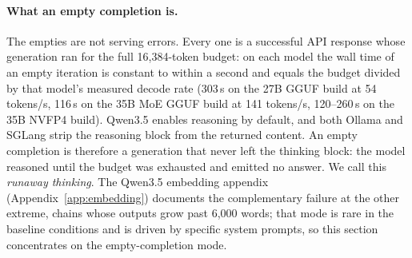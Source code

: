 \documentclass[11pt]{article}
\begin{document}
\paragraph{What an empty completion is.}
The empties are not serving errors. Every one is a successful API response
whose generation ran for the full 16{,}384-token budget: on each model the
wall time of an empty iteration is constant to within a second and equals the
budget divided by that model's measured decode rate (303\,s on the 27B GGUF
build at 54 tokens/s, 116\,s on the 35B MoE GGUF build at 141 tokens/s,
120--260\,s on the 35B NVFP4 build). Qwen3.5 enables reasoning by default,
and both Ollama and SGLang strip the reasoning block from the returned
content. An empty completion is therefore a generation that never left the
thinking block: the model reasoned until the budget was exhausted and emitted
no answer. We call this \emph{runaway thinking}. The Qwen3.5 embedding
appendix (Appendix~\ref{app:embedding}) documents the complementary
failure at the other extreme, chains whose outputs grow past 6{,}000 words;
that mode is rare in the baseline conditions and is driven by specific
system prompts, so this section concentrates on the empty-completion mode.
\end{document}
